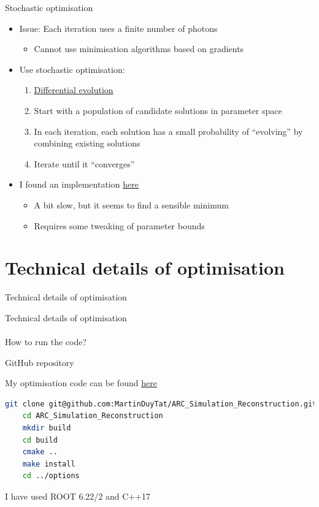 \documentclass{beamer}
\begin{document}
\begin{frame}{Stochastic optimisation}
  \begin{itemize}
    \setlength\itemsep{1.0em}
    \item{Issue: Each iteration uses a finite number of photons}
    \begin{itemize}
      \item{Cannot use minimisation algorithms based on gradients}
    \end{itemize}
    \item{Use stochastic optimisation:}
    \begin{enumerate}
      \item{\href{https://en.wikipedia.org/wiki/Differential_evolution}{Differential evolution}}
      \item{Start with a population of candidate solutions in parameter space}
      \item{In each iteration, each solution has a small probability of ``evolving'' by combining existing solutions}
      \item{Iterate until it ``converges''}
    \end{enumerate}
    \item{I found an implementation \href{https://github.com/milsto/differential-evolution}{here}}
    \begin{itemize}
      \item{A bit slow, but it seems to find a sensible minimum}
      \item{Requires some tweaking of parameter bounds}
    \end{itemize}
  \end{itemize}
\end{frame}

\section{Technical details of optimisation}
\begin{frame}{Technical details of optimisation}
  \begin{center}
    {\huge Technical details of optimisation} \\~\\
    {\large How to run the code?}
  \end{center}
\end{frame}
\begin{frame}[fragile]{GitHub repository}
  \begin{center}
    My optimisation code can be found \href{https://github.com/MartinDuyTat/ARC_Simulation_Reconstruction}{here}
  \end{center}
  \begin{lstlisting}[language=bash, breaklines=true]
    git clone git@github.com:MartinDuyTat/ARC_Simulation_Reconstruction.git
    cd ARC_Simulation_Reconstruction
    mkdir build
    cd build
    cmake ..
    make install
    cd ../options
  \end{lstlisting}
  \begin{center}
    I have used ROOT 6.22/2 and C++17
  \end{center}
\end{frame}
\end{document}
